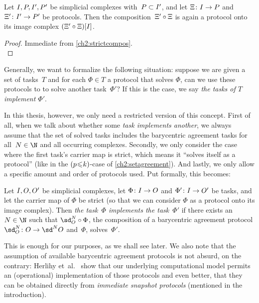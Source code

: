 \begin{thCorollary}
    Let $\cI,\cP,\cI',\cP'$ be simplicial complexes with~$\cP\subset\cI'$,
    and let $\Xi\colon\cI\to\cP$ and $\Xi'\colon\cI'\to\cP'$ be protocols.
    Then the composition~$\Xi'\after\Xi$ is again
    a protocol onto its image complex $(\Xi'\after\Xi)[\cI]$.
\end{thCorollary}

\begin{proof}
    Immediate from \cref{ch2:strictcompos}.
    \\
\end{proof}

Generally, we want to formalize the following situation: suppose we are
given a set of tasks~$T$ and for each $\Phi\in T$ a protocol that
solves $\Phi$, can we use these protocols to to solve another task~$\Phi'$? If
this is the case, we say \emph{the tasks of $T$ implement $\Phi'$}.

In this thesis, however, we only need a restricted version of this concept.
First of all, when we talk about whether some \emph{task implements another},
we always assume that the set of solved tasks includes the barycentric agreement
tasks  for all~$N\in\N$ and all occurring
complexes. Secondly, we only consider the case where the first task's carrier map
is strict, which means it \enquote{solves itself as a protocol} (like in the
$(p\mkern1mu{\leq}\mkern1muk)$-case of \cref{ch2:setagreement}). And lastly, we
only allow a specific amount and order of protocols used. Put formally, this
becomes:

\begin{thDef}
    Let $\cI,\cO,\cO'$ be simplicial complexes, let
    $\Phi\colon\cI\to\cO$ and $\Phi'\colon\cI\to\cO'$ be tasks, and
    let the carrier map of $\Phi$ be strict (so that we can consider $\Phi$ as a
    protocol onto its image complex). Then \emph{the task~$\Phi$ implements the
    task~$\Phi'$} if there exists an $N\in\N$ such that $\sd_{\cO}^N\after\Phi$,
    the composition of a barycentric agreement protocol
    $\sd_{\cO}^N\colon\cO\to\sd^N\cO$ and~$\Phi$, solves~$\Phi'$.
\end{thDef}

This is enough for our purposes, as we shall see later. We also note that the
assumption of available barycentric agreement protocols is not absurd, on
the contrary: Herlihy et~al.~\cite[Corollary 4.2.10]{bookc:herlihyetal13} show
that our underlying computational model permits an (operational) implementation
of those protocols and even better, that they can be obtained directly from 
\emph{immediate snapshot protocols} (mentioned in the introduction).
